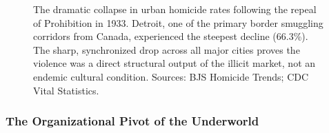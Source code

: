 \documentclass[
]{article}
\begin{document}
\begin{figure}[htbp]
\centering
{}
\caption{The dramatic collapse in urban homicide rates following the repeal of Prohibition in 1933. Detroit, one of the primary border smuggling corridors from Canada, experienced the steepest decline (66.3\%). The sharp, synchronized drop across all major cities proves the violence was a direct structural output of the illicit market, not an endemic cultural condition. Sources: BJS Homicide Trends; CDC Vital Statistics.}
\label{fig:post-repeal-decline}
\end{figure}

\subsubsection{\texorpdfstring{\textbf{The Organizational Pivot of the
Underworld}}{The Organizational Pivot of the Underworld}}\label{the-organizational-pivot-of-the-underworld}
\end{document}
